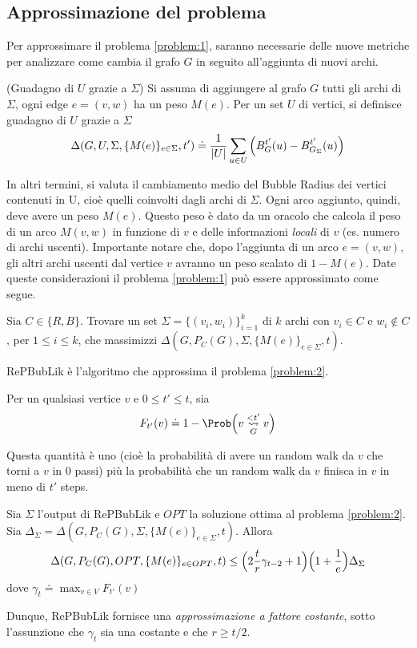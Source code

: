 \subsection{Approssimazione del problema}
Per approssimare il problema \ref{problem:1}, saranno necessarie delle nuove metriche per analizzare come cambia il grafo $G$
in seguito all'aggiunta di nuovi archi.
\begin{definition}(Guadagno di $U$ grazie a $\Sigma$)
    Si assuma di aggiungere al grafo $G$ tutti gli archi di $\Sigma$, ogni edge  $e=(v,w)$ ha un peso $M(e)$. Per un set $U$ di vertici, si definisce guadagno di $U$ 
    grazie a $\Sigma$
    \begin{equation}\label{REP:gain}
        \Delta(G,U,\Sigma,\{M(e)\}_{e\in\Sigma},t')\doteq {1\over{|U|}}\sum_{u\in U}{\Big(B_{G}^{t'}(u) - B_{G_{\Sigma}}^{t'}(u)\Big)}
    \end{equation} 
\end{definition}
In altri termini, si valuta il cambiamento medio del Bubble Radius dei vertici contenuti in U, cioè quelli coinvolti dagli archi di $\Sigma$.
Ogni arco aggiunto, quindi, deve avere un peso $M(e)$. Questo peso è dato da un oracolo che calcola il peso di un arco $M(v,w)$ in funzione di $v$ e delle informazioni
\emph{locali} di $v$ (es. numero di archi uscenti). Importante notare che, dopo l'aggiunta di un arco $e=(v,w)$, gli altri archi uscenti dal vertice $v$
avranno un peso scalato di $1-M(e)$.
Date queste considerazioni il problema \ref{problem:1} può essere approssimato come segue.
\begin{problem}\label{problem:2}
    Sia $C\in\{R,B\}$. Trovare un set $\Sigma={\{(v_i,w_i)\}}_{i=1}^{k}$ di $k$ archi con $v_i\in C$ e $w_i \not \in C$, per $1\le i \le k$,
    che massimizzi $\Delta(G,P_C(G),\Sigma,\{M(e)\}_{e\in\Sigma},t)$.
\end{problem}
RePBubLik è l'algoritmo che approssima il problema \ref{problem:2}.
\begin{definition}
    Per un qualsiasi vertice $v$ e $ 0 \le t' \le t $, sia
    \begin{equation}\label{eq:F}
        F_{t'}(v)\doteq 1 -\Prob\Big( v \overset{<t'}{\underset{G}{\leadsto}}v\Big)
    \end{equation}
\end{definition} 
Questa quantità è uno (cioè la probabilità di avere un random walk da $v$ che torni a $v$ in 0 passi) più la probabilità che un random walk da $v$ finisca in $v$
in meno di $t'$ steps.
\begin{theorem}
    Sia $\Sigma$ l'output di RePBubLik e $OPT$ la soluzione ottima al problema \ref{problem:2}. 
    Sia $\Delta_{\Sigma}=\Delta(G,P_C(G),\Sigma,\{M(e)\}_{e\in\Sigma},t)$. Allora
    \begin{equation}
        \Delta(G,P_C(G),OPT,\{M(e)\}_{e\in OPT},t) \le \Big(2{t\over{r}}\gamma_{t-2} + 1\Big)\Big(1+{1\over{e}}\Big)\Delta_{\Sigma}
    \end{equation}
    dove $\gamma_t\doteq \max_{v\in V} F_{t'}(v)$
\end{theorem}
Dunque, RePBubLik fornisce una \emph{approssimazione a fattore costante}, sotto l'assunzione che $\gamma_t$ sia una costante e che $r\ge t/2$.
